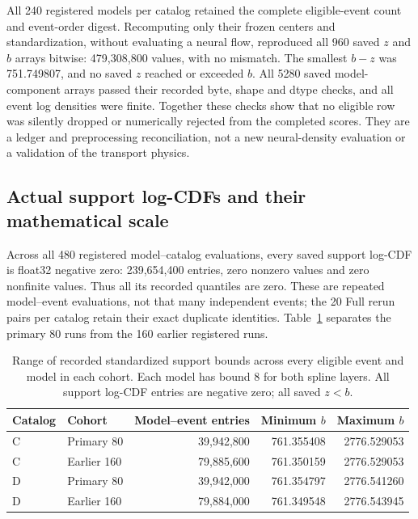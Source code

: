 All 240 registered models per catalog retained the complete eligible-event
count and event-order digest. Recomputing only their frozen centers and
standardization, without evaluating a neural flow, reproduced all 960 saved
$z$ and $b$ arrays bitwise: 479,308,800 values, with no mismatch. The smallest
$b-z$ was 751.749807, and no saved $z$ reached or exceeded $b$.
All 5280 saved model-component arrays passed their recorded byte, shape and
dtype checks, and all event log densities were finite. Together these checks
show that no eligible row was silently dropped or numerically rejected from
the completed scores. They are a ledger and preprocessing reconciliation,
not a new neural-density evaluation or a validation of the transport physics.

\subsection{Actual support log-CDFs and their mathematical scale}
\label{sec:actual_support_cdfs}

Across all 480 registered model--catalog evaluations, every saved support
log-CDF is float32 negative zero: 239,654,400 entries, zero nonzero values and
zero nonfinite values. Thus all its recorded quantiles are zero. These are
repeated model--event evaluations, not that many independent events; the 20
Full rerun pairs per catalog retain their exact duplicate identities.
Table~\ref{tab:actual_support_bounds} separates the primary 80 runs from the
160 earlier registered runs.

\begin{table}[!htbp]
\centering\small
\caption{Range of recorded standardized support bounds across every eligible
event and model in each cohort. Each model has bound 8 for both spline layers.
All support log-CDF entries are negative zero; all saved $z<b$.}
\label{tab:actual_support_bounds}
\begin{tabular}{llrrr}
\toprule
Catalog & Cohort & Model--event entries & Minimum $b$ & Maximum $b$\\
\midrule
C & Primary 80 & 39,942,800 & 761.355408 & 2776.529053\\
C & Earlier 160 & 79,885,600 & 761.350159 & 2776.529053\\
D & Primary 80 & 39,942,000 & 761.354797 & 2776.541260\\
D & Earlier 160 & 79,884,000 & 761.349548 & 2776.543945\\
\bottomrule
\end{tabular}
\end{table}

